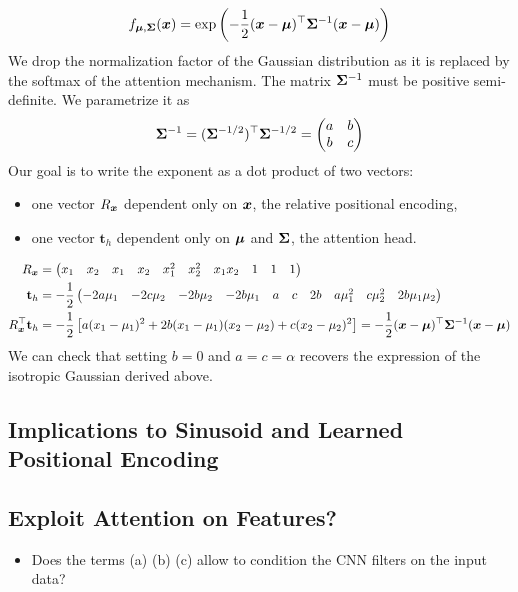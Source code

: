 \documentclass{article} %
\begin{document}
\begin{align}
  f_{{\bm{\mu}}, {\bm{\Sigma}}}({\bm{x}}) = \exp \left(
    - \frac 1 2
    ({\bm{x}} - {\bm{\mu}})^\top {\bm{\Sigma}}^{-1} ({\bm{x}} - {\bm{\mu}})
  \right)
\end{align}
We drop the normalization factor of the Gaussian distribution as it is replaced by the softmax of the attention mechanism.
The matrix ${\bm{\Sigma}}^{-1}$ must be positive semi-definite.
We parametrize it as 
\begin{align}
  {\bm{\Sigma}}^{-1} = ({\bm{\Sigma}}^{-1/2})^\top{\bm{\Sigma}}^{-1/2} = \begin{pmatrix}a & b \\ b & c\end{pmatrix}  
\end{align}
Our goal is to write the exponent as a dot product of two vectors:
\begin{itemize}
  \item one vector $R_{\bm{x}}$ dependent only on ${\bm{x}}$, the relative positional encoding,
  \item one vector $\mathbf{t}_h$ dependent only on ${\bm{\mu}}$ and ${\bm{\Sigma}}$, the attention head.
\end{itemize}
\begin{align}
  R_{\bm{x}} &= 
  \begin{pmatrix}
    x_1      & x_2       & x_1      & x_2      & x_1^2   & x_2^2 & x_1 x_2 & 1        & 1         & 1
  \end{pmatrix}\\
  \mathbf{t}_h &= -\frac{1}{2}
  \begin{pmatrix}
    -2a\mu_1 & -2c \mu_2 & -2b\mu_2 & -2b\mu_1 & a       & c     & 2b      & a\mu_1^2 & c\mu_2^2 & 2b\mu_1 \mu_2
  \end{pmatrix}\\
  R_{\bm{x}}^\top \mathbf{t}_h &=
  -\frac{1}{2} 
  \left[
  a(x_1 - \mu_1)^2 + 2b(x_1-\mu_1)(x_2 -\mu_2) + c(x_2-\mu_2)^2 
  \right]
  = - \frac 1 2 ({\bm{x}} - {\bm{\mu}})^\top {\bm{\Sigma}}^{-1} ({\bm{x}} - {\bm{\mu}})
\end{align}
We can check that setting $b = 0$ and $a=c=\alpha$ recovers the expression of the isotropic Gaussian derived above.

\subsection{Implications to Sinusoid and Learned Positional Encoding} 


\subsection{Exploit Attention on Features?} 
\begin{itemize}

  \item Does the terms (a) (b) (c) allow to condition the CNN filters on the input data?
\end{itemize}
\end{document}
